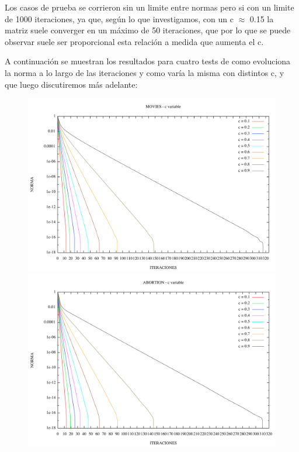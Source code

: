 Los casos de prueba se corrieron sin un limite entre normas pero si con un limite de 1000 iteraciones, ya que, según lo que investigamos, con un c 	$\approx$ 0.15 la matriz suele converger en un máximo de 50 iteraciones, que por lo que se puede observar suele ser proporcional esta relación a medida que aumenta el c.

A continuación se muestran los resultados para cuatro tests de como evoluciona la norma a lo largo de las iteraciones y como varía la misma con distintos c, y que luego discutiremos más adelante:

\begin{figure}
\begin{center}
       \includegraphics[scale=0.5]{imagenes/pagerank_movies_norma.png}
        \includegraphics[scale=0.5]{imagenes/pagerank_abortion_norma.png}
       \end{center}
\end{figure}

